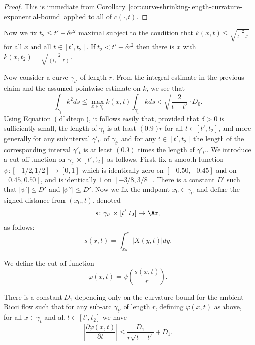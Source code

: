 \begin{proof}
This is immediate from Corollary~\ref{cor:curve-shrinking-length-curvature-exponential-bound} applied to all
of $c(\cdot,t)$.
\end{proof}

Now we fix $t_2\le t'+\delta r^2$ maximal subject to the condition
that $k(x,t)\le \sqrt{\frac{2}{t-t'}}$ for all $x$ and all $t\in
[t',t_2]$. If $t_2<t'+\delta r^2$ then there is $x$ with
$k(x,t_2)=\sqrt{\frac{2}{(t_2-t')}}$.

Now consider a curve $\gamma_{t'}$ of length $r$. From the integral estimate in
the previous claim and the assumed pointwise estimate on $k$, we see that
$$\int_{\gamma_t}k^2 ds\le \max_{x\in\gamma_t}k(x,t)\int_{\gamma_{t}} kds
<\sqrt{\frac{2}{t-t'}}\cdot D_0.$$ Using Equation~(\ref{dLdteqn}),
it follows easily that, provided that $\delta>0$ is sufficiently
small, the length of $\gamma_t$ is at least $(0.9)r$ for all $t\in
[t',t_2]$, and more generally for any subinterval $\gamma'_{t'}$ of
$\gamma_{t'}$ and for any $t\in [t',t_2]$ the length of the
corresponding interval $\gamma'_t$ is at least $(0.9)$ times the
length of $\gamma'_{t'}$. We introduce a cut-off function on
$\gamma_{t'}\times [t',t_2]$ as follows. First, fix a smooth
function $\psi\colon [-1/2,1/2]\to [0,1]$ which is identically zero
on $[-0.50,-0.45]$ and on $[0.45,0.50]$, and is identically $1$ on
$[-3/8,3/8]$. There is a constant $D'$ such that $|\psi'|\le D'$ and
$|\psi''|\le D'$. Now we fix the midpoint $x_0\in \gamma_{t'}$ and
define the signed distance from $(x_0,t)$, denoted
$$s\colon \gamma_{t'}\times [t',t_2]\to \Ar,$$
as follows:
$$s(x,t)=\int _{x_0}^x|X(y,t)|dy.$$

We define the cut-off function
$$\varphi(x,t)=\psi\left(\frac{s(x,t)}{r}\right).$$



\begin{claim}
\label{claim:cutoff-function-time-derivative-bound}
\label{1887}
There is a constant $D_1$ depending only on the curvature bound for
 the ambient Ricci flow such that for any sub-arc $\gamma_{t'}$ of
 length $r$, defining $\varphi(x,t)$ as above, for all $x\in \gamma_t$
 and all $t\in [t',t_2]$ we have
$$\left|\frac{\partial \varphi(x,t)}{\partial t}\right|\le
\frac{D_1}{r\sqrt{t-t'}}+D_1.$$
\end{claim}


